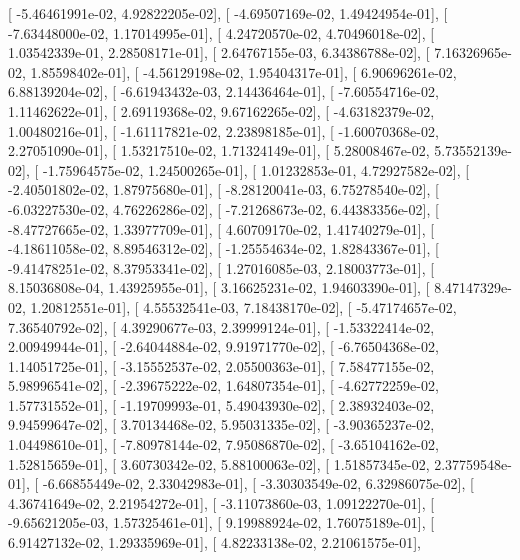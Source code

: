 \documentclass{article}
\begin{document}
       [ -5.46461991e-02,   4.92822205e-02],
       [ -4.69507169e-02,   1.49424954e-01],
       [ -7.63448000e-02,   1.17014995e-01],
       [  4.24720570e-02,   4.70496018e-02],
       [  1.03542339e-01,   2.28508171e-01],
       [  2.64767155e-03,   6.34386788e-02],
       [  7.16326965e-02,   1.85598402e-01],
       [ -4.56129198e-02,   1.95404317e-01],
       [  6.90696261e-02,   6.88139204e-02],
       [ -6.61943432e-03,   2.14436464e-01],
       [ -7.60554716e-02,   1.11462622e-01],
       [  2.69119368e-02,   9.67162265e-02],
       [ -4.63182379e-02,   1.00480216e-01],
       [ -1.61117821e-02,   2.23898185e-01],
       [ -1.60070368e-02,   2.27051090e-01],
       [  1.53217510e-02,   1.71324149e-01],
       [  5.28008467e-02,   5.73552139e-02],
       [ -1.75964575e-02,   1.24500265e-01],
       [  1.01232853e-01,   4.72927582e-02],
       [ -2.40501802e-02,   1.87975680e-01],
       [ -8.28120041e-03,   6.75278540e-02],
       [ -6.03227530e-02,   4.76226286e-02],
       [ -7.21268673e-02,   6.44383356e-02],
       [ -8.47727665e-02,   1.33977709e-01],
       [  4.60709170e-02,   1.41740279e-01],
       [ -4.18611058e-02,   8.89546312e-02],
       [ -1.25554634e-02,   1.82843367e-01],
       [ -9.41478251e-02,   8.37953341e-02],
       [  1.27016085e-03,   2.18003773e-01],
       [  8.15036808e-04,   1.43925955e-01],
       [  3.16625231e-02,   1.94603390e-01],
       [  8.47147329e-02,   1.20812551e-01],
       [  4.55532541e-03,   7.18438170e-02],
       [ -5.47174657e-02,   7.36540792e-02],
       [  4.39290677e-03,   2.39999124e-01],
       [ -1.53322414e-02,   2.00949944e-01],
       [ -2.64044884e-02,   9.91971770e-02],
       [ -6.76504368e-02,   1.14051725e-01],
       [ -3.15552537e-02,   2.05500363e-01],
       [  7.58477155e-02,   5.98996541e-02],
       [ -2.39675222e-02,   1.64807354e-01],
       [ -4.62772259e-02,   1.57731552e-01],
       [ -1.19709993e-01,   5.49043930e-02],
       [  2.38932403e-02,   9.94599647e-02],
       [  3.70134468e-02,   5.95031335e-02],
       [ -3.90365237e-02,   1.04498610e-01],
       [ -7.80978144e-02,   7.95086870e-02],
       [ -3.65104162e-02,   1.52815659e-01],
       [  3.60730342e-02,   5.88100063e-02],
       [  1.51857345e-02,   2.37759548e-01],
       [ -6.66855449e-02,   2.33042983e-01],
       [ -3.30303549e-02,   6.32986075e-02],
       [  4.36741649e-02,   2.21954272e-01],
       [ -3.11073860e-03,   1.09122270e-01],
       [ -9.65621205e-03,   1.57325461e-01],
       [  9.19988924e-02,   1.76075189e-01],
       [  6.91427132e-02,   1.29335969e-01],
       [  4.82233138e-02,   2.21061575e-01],
\end{document}
